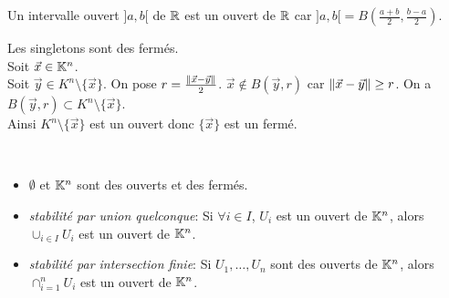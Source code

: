 \documentclass{book}
\begin{document}
\begin{Exemple}
Un intervalle ouvert $]a,b[$ de $\mathbb{R}$ est un ouvert de $\mathbb{R}$ car $]a,b[=B(\frac{a+b}{2},\frac{b-a}{2})$.
\end{Exemple}
\begin{Exemple}
\begin{minipage}[c]{0.6\linewidth}{
Les singletons sont des fermés.\\ 
Soit $\vec{x}\in \mathbb{K}^n$.\\
Soit $\vec{y}\in K^n\setminus \{\vec{x}\}$. On pose $r=\frac{\mathopen\lVert \vec{x}-\vec{y} \mathclose\rVert}{2}$.
$\vec{x}\notin B(\vec{y},r)$ car $\mathopen\lVert \vec{x}-\vec{y} \mathclose\rVert\geq r$. On a $B(\vec{y},r)\subset K^n\setminus \{\vec{x}\}$.\\
Ainsi $K^n\setminus \{\vec{x}\}$ est un ouvert donc  $\{\vec{x}\}$ est un fermé.
}
\end{minipage} 
    \begin{minipage}[c]{0.4\linewidth}{\hspace*{0.2\linewidth}
\\\begin{tiny}
\end{tiny}
}
\end{minipage} 
\end{Exemple}
\begin{Proposition}
\begin{itemize}
\item $\emptyset$ et $\mathbb{K}^n$ sont des ouverts et des fermés.
\item \emph{stabilité par union quelconque}:
  Si $\forall i\in I$, $U_i$ est un ouvert de $\mathbb{K}^n$, alors $\cup_{i\in I} U_i$ est un ouvert de $\mathbb{K}^n$.
\item \emph{stabilité par intersection finie}:
  Si $U_1, \dots, U_n$ sont des ouverts de $\mathbb{K}^n$, alors $\cap_{i=1}^n U_i$ est un ouvert de $\mathbb{K}^n$.
\end{itemize}
\end{Proposition}
\end{document}
